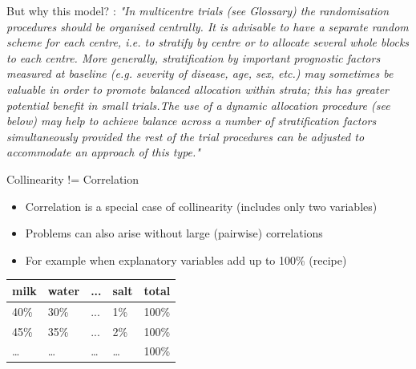 \documentclass[english]{beamer}\usepackage[]{graphicx}\usepackage[]{xcolor}
\begin{document}
\begin{frame}[plain]{But why this model?}
\cite{ICHE9}:
\textit{
\tiny{
"In multicentre trials (see Glossary) the randomisation procedures should be organised centrally. It is advisable to have a separate random scheme for each centre, i.e. to stratify by centre or to allocate several whole blocks to each centre. More generally, stratification by important prognostic factors measured at baseline (e.g. severity of disease, age, sex, etc.) may sometimes be valuable in order to promote balanced allocation within strata; this has greater potential benefit in small trials.}\footnotesize{}\tiny{The use of a dynamic allocation procedure (see below) may help to achieve balance across a number of stratification factors simultaneously provided the rest of the trial procedures can be adjusted to accommodate an approach of this type.}\footnotesize{"}
}


\end{frame}
\begin{frame}{Collinearity != Correlation}

\begin{itemize}
\item Correlation is a special case of collinearity (includes only two variables)
\item Problems can also arise without large (pairwise) correlations
\item For example when explanatory variables add up to 100\% (recipe)
\end{itemize}


\begin{table}[]
\centering
\begin{tabular}{|l|l|l|l|l|}
\hline
milk & water & ... & salt & total\\ 
\hline
40\% & 30\%  & ... & 1\%  & 100\%\\ 
45\% & 35\%  & ... & 2\%  & 100\%\\
\dots& \dots  & \dots & \dots & 100\% \\ \hline
\end{tabular}%
\end{table}




\end{frame}
\end{document}
